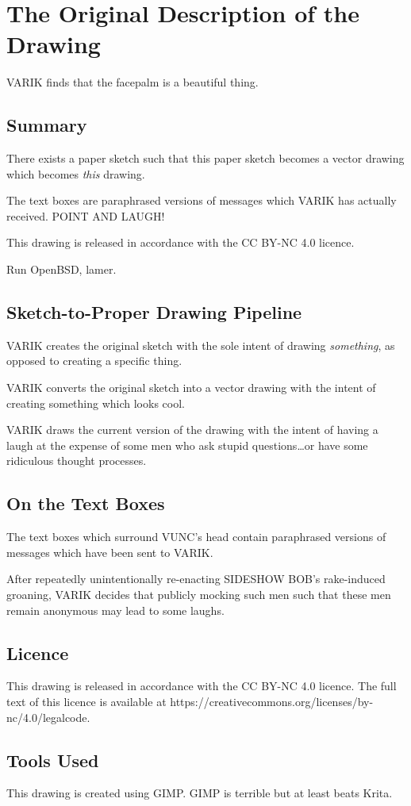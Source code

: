 \documentclass{report}
\begin{document}
\section{The Original Description of the Drawing}
VARIK finds that the facepalm is a beautiful thing.
\subsection{Summary}
There exists a paper sketch such that this paper sketch becomes a vector drawing which becomes \textit{this} drawing.

The text boxes are paraphrased versions of messages which VARIK has actually received.  POINT AND LAUGH!

This drawing is released in accordance with the CC BY-NC 4.0 licence.

Run OpenBSD, lamer.
\subsection{Sketch-to-Proper Drawing Pipeline}
VARIK creates the original sketch with the sole intent of drawing \textit{something}, as opposed to creating a specific thing.

VARIK converts the original sketch into a vector drawing with the intent of creating something which looks cool.

VARIK draws the current version of the drawing with the intent of having a laugh at the expense of some men who ask stupid questions\ldots or have some ridiculous thought processes.
\subsection{On the Text Boxes}
The text boxes which surround VUNC's head contain paraphrased versions of messages which have been sent to VARIK.

After repeatedly unintentionally re-enacting SIDESHOW BOB's rake-induced groaning, VARIK decides that publicly mocking such men such that these men remain anonymous may lead to some laughs.
\subsection{Licence}
This drawing is released in accordance with the CC BY-NC 4.0 licence.  The full text of this licence is available at https://creativecommons.org/licenses/by-nc/4.0/legalcode.
\subsection{Tools Used}
This drawing is created using GIMP.  GIMP is terrible but at least beats Krita.
\end{document}
